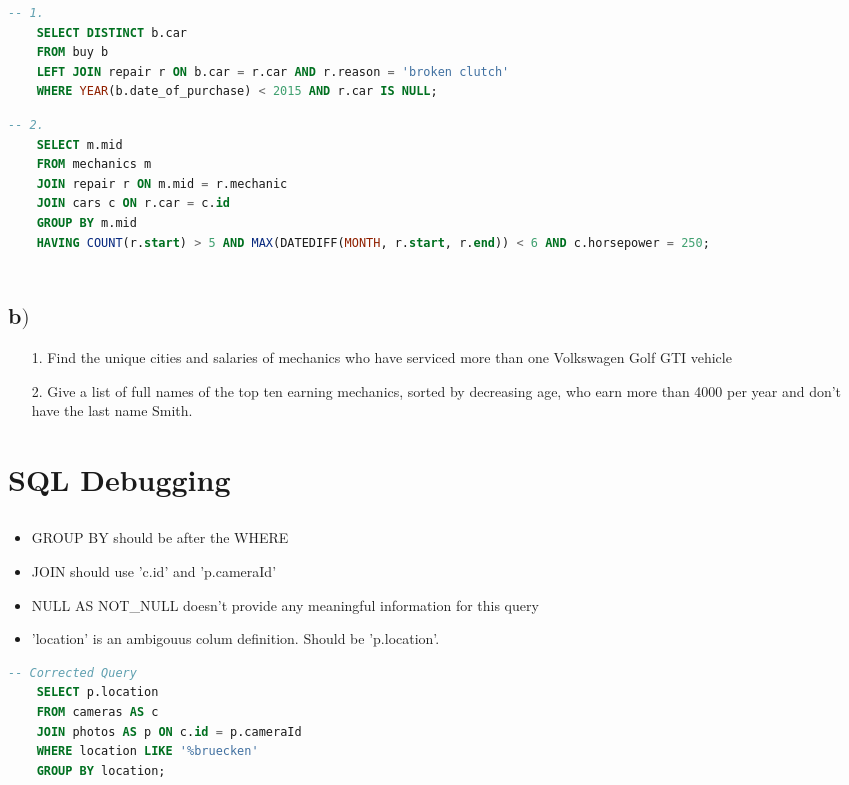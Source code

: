 \begin{lstlisting}[language=SQL]
	-- 1.
	SELECT DISTINCT b.car
	FROM buy b
	LEFT JOIN repair r ON b.car = r.car AND r.reason = 'broken clutch'
	WHERE YEAR(b.date_of_purchase) < 2015 AND r.car IS NULL;
\end{lstlisting}

\begin{lstlisting}[language=SQL]
	-- 2.
	SELECT m.mid 
	FROM mechanics m
	JOIN repair r ON m.mid = r.mechanic
	JOIN cars c ON r.car = c.id
	GROUP BY m.mid
	HAVING COUNT(r.start) > 5 AND MAX(DATEDIFF(MONTH, r.start, r.end)) < 6 AND c.horsepower = 250;  
	
\end{lstlisting}

\subsection{b$)$}

\begin{itemize}
	\item[1.] Find the unique cities and salaries of mechanics who have serviced more than one Volkswagen Golf GTI vehicle
	\item[2.] Give a list of full names of the top ten earning mechanics, sorted by decreasing age, who earn more than 4000 per year and don’t have the last name Smith.
\end{itemize}
	
\section{SQL Debugging}

\subsection{}

\begin{itemize}
	\item GROUP BY should be after the WHERE
	\item JOIN should use 'c.id' and 'p.cameraId'
	\item NULL AS NOT\_NULL doesn't provide any meaningful information for this query
	\item 'location' is an ambigouus colum definition. Should be 'p.location'.
\end{itemize}

\begin{lstlisting}[language=SQL]
	-- Corrected Query
	SELECT p.location
	FROM cameras AS c 
	JOIN photos AS p ON c.id = p.cameraId
	WHERE location LIKE '%bruecken'
	GROUP BY location;
\end{lstlisting}

